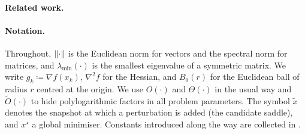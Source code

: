 \documentclass[11pt]{article}
\theoremstyle{plain}
\theoremstyle{definition}
\theoremstyle{remark}
\DeclarePairedDelimiter{\norm}{\lVert}{\rVert}
\newcommand{\lmin}{\lambda_{\min}}
\newcommand{\grad}{\nabla}
\newcommand{\Hess}{\nabla^2}
\newcommand{\eps}{\varepsilon}
\newcommand{\xt}{\tilde{x}}
\newcommand{\xs}{x^{\star}}
\newcommand{\Otil}{\widetilde{O}}
\begin{document}
\paragraph{Related work.}

\paragraph{Notation.}
Throughout, $\norm{\cdot}$ is the Euclidean norm for vectors and the
spectral norm for matrices, and $\lmin(\cdot)$ is the smallest
eigenvalue of a symmetric matrix. We write $g_{k}\coloneqq\grad
f(x_{k})$, $\Hess f$ for the Hessian, and $B_{0}(r)$ for the Euclidean
ball of radius $r$ centred at the origin. We use $O(\cdot)$ and
$\Theta(\cdot)$ in the usual way and $\Otil(\cdot)$ to hide
polylogarithmic factors in all problem parameters. The symbol $\xt$
denotes the snapshot at which a perturbation is added (the candidate
saddle), and $\xs$ a global minimiser. Constants introduced along the
way are collected in .
\end{document}
